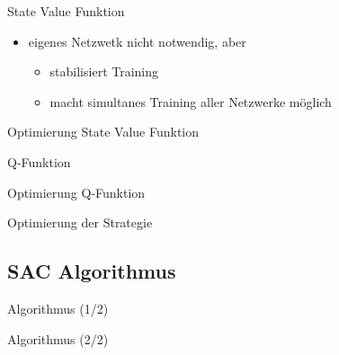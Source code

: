 \begin{frame}{State Value Funktion}
\begin{itemize}
\item eigenes Netzwetk nicht notwendig, aber
\begin{itemize}
\item stabilisiert Training
\item macht simultanes Training aller Netzwerke möglich
\end{itemize}
\end{itemize}
\end{frame}

\begin{frame}{Optimierung State Value Funktion}

\end{frame}

\begin{frame}{Q-Funktion}

\end{frame}

\begin{frame}{Optimierung Q-Funktion}

\end{frame}

\begin{frame}{Optimierung der Strategie}

\end{frame}

\subsection{SAC Algorithmus}

\begin{frame}{Algorithmus (1/2)}

\end{frame}

\begin{frame}{Algorithmus (2/2)}

\end{frame}







